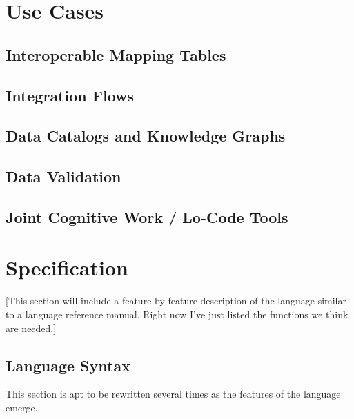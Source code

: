 \documentclass[9pt,letterpaper]{article}
\begin{document}


\section{Use Cases}

\subsection{Interoperable Mapping Tables}

\subsection{Integration Flows}

\subsection{Data Catalogs and Knowledge Graphs}

\subsection{Data Validation}

\subsection{Joint Cognitive Work / Lo-Code Tools}

\section{Specification}

[This section will include a feature-by-feature description of the language similar to a language reference manual. Right now I've just listed the functions we think are needed.]

\subsection{Language Syntax}
This section is apt to be rewritten several times as the features of the language emerge.
\end{document}
